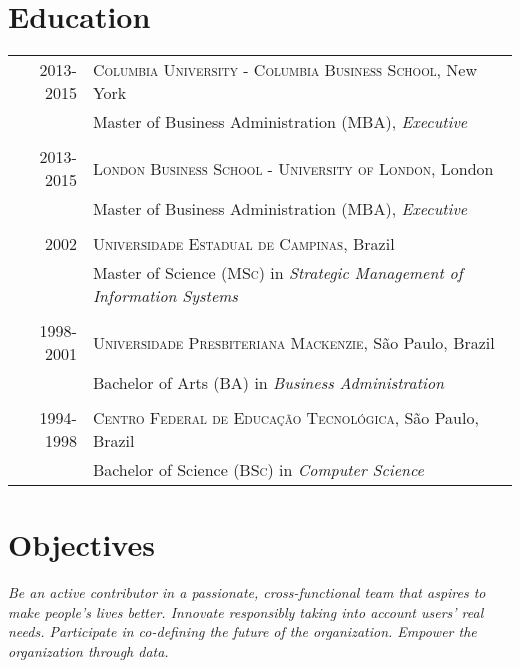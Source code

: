 \documentclass[a4paper,10pt]{article}
\begin{document}
\section{Education}
\begin{tabular}{rl}
 \textsc{2013-2015} & \textsc{Columbia University - Columbia Business School},
 New York\\

 & Master of Business Administration (\textsc{MBA}), \emph{Executive}\\

 &\\

 \textsc{2013-2015} & \textsc{London Business School - University of London},
 London\\

 & Master of Business Administration (\textsc{MBA}), \emph{Executive}\\

 &\\

 \textsc{2002} & \textsc{Universidade Estadual de Campinas}, Brazil\\

 & Master of Science (\textsc{MSc}) in \emph{Strategic Management of Information
   Systems} \\

  &\\

 \textsc{1998-2001} & \textsc{Universidade Presbiteriana Mackenzie}, S\~{a}o
 Paulo, Brazil\\

 & Bachelor of Arts (\textsc{BA}) in \emph{Business Administration} \\

 &\\

 \textsc{1994-1998} & \textsc{Centro Federal de Educa\c{c}\~{a}o
   Tecnol\'{o}gica}, S\~{a}o Paulo, Brazil\\

 & Bachelor of Science (\textsc{BSc}) in \emph{Computer Science} \\

\end{tabular}

\section{Objectives}
\emph{Be an active contributor in a passionate, cross-functional team that
  aspires to make people's lives better. Innovate responsibly taking into
  account users' real needs. Participate in co-defining the future of the
  organization. Empower the organization through data.}
\end{document}
